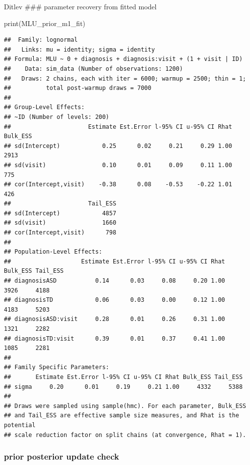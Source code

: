 \documentclass[
]{article}
\newenvironment{Shaded}{\begin{snugshade}}{\end{snugshade}}
\newcommand{\FunctionTok}[1]{\textcolor[rgb]{0.00,0.00,0.00}{#1}}
\newcommand{\NormalTok}[1]{#1}
\begin{document}
Ditlev \#\#\# parameter recovery from fitted model

\begin{Shaded}
\begin{Highlighting}[]
\FunctionTok{print}\NormalTok{(MLU\_prior\_m1\_fit)}
\end{Highlighting}
\end{Shaded}

\begin{verbatim}
##  Family: lognormal 
##   Links: mu = identity; sigma = identity 
## Formula: MLU ~ 0 + diagnosis + diagnosis:visit + (1 + visit | ID) 
##    Data: sim_data (Number of observations: 1200) 
##   Draws: 2 chains, each with iter = 6000; warmup = 2500; thin = 1;
##          total post-warmup draws = 7000
## 
## Group-Level Effects: 
## ~ID (Number of levels: 200) 
##                      Estimate Est.Error l-95% CI u-95% CI Rhat Bulk_ESS
## sd(Intercept)            0.25      0.02     0.21     0.29 1.00     2913
## sd(visit)                0.10      0.01     0.09     0.11 1.00      775
## cor(Intercept,visit)    -0.38      0.08    -0.53    -0.22 1.01      426
##                      Tail_ESS
## sd(Intercept)            4857
## sd(visit)                1660
## cor(Intercept,visit)      798
## 
## Population-Level Effects: 
##                    Estimate Est.Error l-95% CI u-95% CI Rhat Bulk_ESS Tail_ESS
## diagnosisASD           0.14      0.03     0.08     0.20 1.00     3926     4188
## diagnosisTD            0.06      0.03     0.00     0.12 1.00     4183     5203
## diagnosisASD:visit     0.28      0.01     0.26     0.31 1.00     1321     2282
## diagnosisTD:visit      0.39      0.01     0.37     0.41 1.00     1085     2281
## 
## Family Specific Parameters: 
##       Estimate Est.Error l-95% CI u-95% CI Rhat Bulk_ESS Tail_ESS
## sigma     0.20      0.01     0.19     0.21 1.00     4332     5388
## 
## Draws were sampled using sample(hmc). For each parameter, Bulk_ESS
## and Tail_ESS are effective sample size measures, and Rhat is the potential
## scale reduction factor on split chains (at convergence, Rhat = 1).
\end{verbatim}

\hypertarget{prior-posterior-update-check}{%
\subsubsection{prior posterior update
check}\label{prior-posterior-update-check}}
\end{document}
